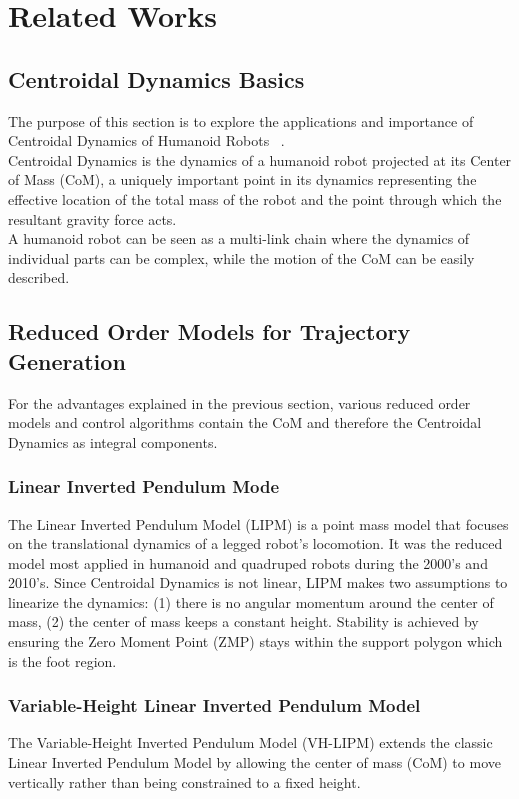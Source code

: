 \documentclass[main.tex]{subfiles}
\begin{document}
\section{Related Works}\label{sec:relatedworks}

\subsection{Centroidal Dynamics Basics}

The purpose of this section is to explore the applications and importance of Centroidal Dynamics of Humanoid Robots ~\cite{CD}. 
\\Centroidal Dynamics is the dynamics of a humanoid robot projected at its Center of Mass (CoM), a uniquely important point in its dynamics representing the effective location of the total mass of the robot and the point through which the resultant gravity force acts. 
\\A humanoid robot can be seen as a multi-link chain where the dynamics of individual parts can be complex, while the motion of the CoM can be easily described. 

\subsection{Reduced Order Models for Trajectory Generation}
\label{sec:rom}
For the advantages explained in the previous section, various reduced order models and control algorithms contain the CoM and therefore the Centroidal Dynamics as integral components. 

\subsubsection{Linear Inverted Pendulum Mode}
The Linear Inverted Pendulum Model (LIPM) \cite{LIPM} is a point mass model that focuses on the translational dynamics of a legged robot's locomotion. It was the reduced model most applied in humanoid and quadruped robots during the 2000's and 2010's.
Since Centroidal Dynamics is not linear, LIPM makes two assumptions to linearize the dynamics: (1) there is no angular momentum around the center of mass, (2) the center of mass keeps a constant height.
Stability is achieved by ensuring the Zero Moment Point (ZMP) stays within the support polygon which is the foot region.

\subsubsection{Variable-Height Linear Inverted Pendulum Model}
The Variable-Height Inverted Pendulum Model (VH-LIPM) \cite{VHLIPM} extends the classic Linear Inverted Pendulum Model by allowing the center of mass (CoM) to move vertically rather than being constrained to a fixed height.
\end{document}
